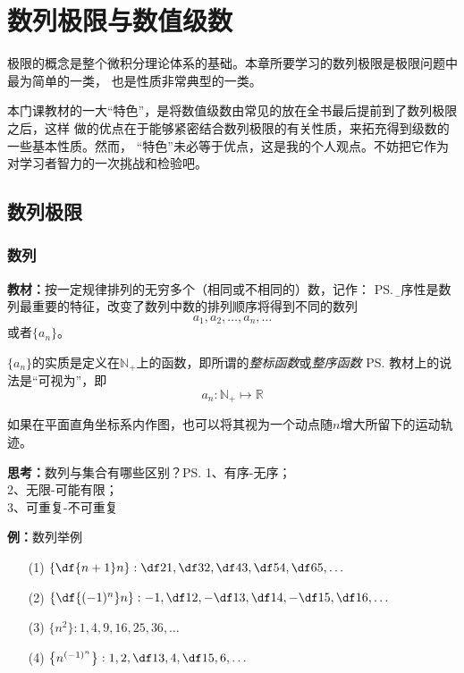 \setcounter{chapter}{1}

\chapter{数列极限与数值级数}

极限的概念是整个微积分理论体系的基础。本章所要学习的数列极限是极限问题中最为简单的一类，
也是性质非常典型的一类。

本门课教材的一大“特色”，是将数值级数由常见的放在全书最后提前到了数列极限之后，这样
做的优点在于能够紧密结合数列极限的有关性质，来拓充得到级数的一些基本性质。然而，
“特色”未必等于优点，这是我的个人观点。不妨把它作为对学习者智力的一次挑战和检验吧。

\section{数列极限}

\subsection{数列}

{\bf 教材：}按一定规律排列的无穷多个（相同或不相同的）数，记作：
\ps{\b 有序性是数列最重要的特征，改变了数列中数的排列顺序将得到不同的数列}
$$a_1,a_2,\ldots,a_n,\ldots$$
或者$\{a_n\}$。

$\{a_n\}$的实质是定义在$\mathbb{N}_+$上的函数，即所谓的{\it 整标函数}或{\it 整序函数}
\ps{教材上的说法是“可视为”}，即
$$a_n:\mathbb{N}_+\mapsto\mathbb{R}$$

如果在平面直角坐标系内作图，也可以将其视为一个动点随$n$增大所留下的运动轨迹。

{\bf 思考：}数列与集合有哪些区别？\ps{1、有序-无序；\\ 2、无限-可能有限；\\ 3、可重复-不可重复}

{\bf 例：}数列举例

\begin{enumerate}[(1)]
  \setlength{\itemindent}{1cm}
  \item[(1)] $\left\{\df{n+1}n\right\}:\df 21,\df 32,\df43,\df54,\df65,\ldots$
  \item[(2)] $\left\{\df{(-1)^n}n\right\}:-1,\df12,-\df13,\df14,-\df15,\df16,\ldots$
  \item[(3)] $\{n^2\}:1,4,9,16,25,36,\ldots$
  \item[(4)] $\left\{n^{(-1)^n}\right\}:1,2,\df13,4,\df15,6,\ldots$
\end{enumerate}

